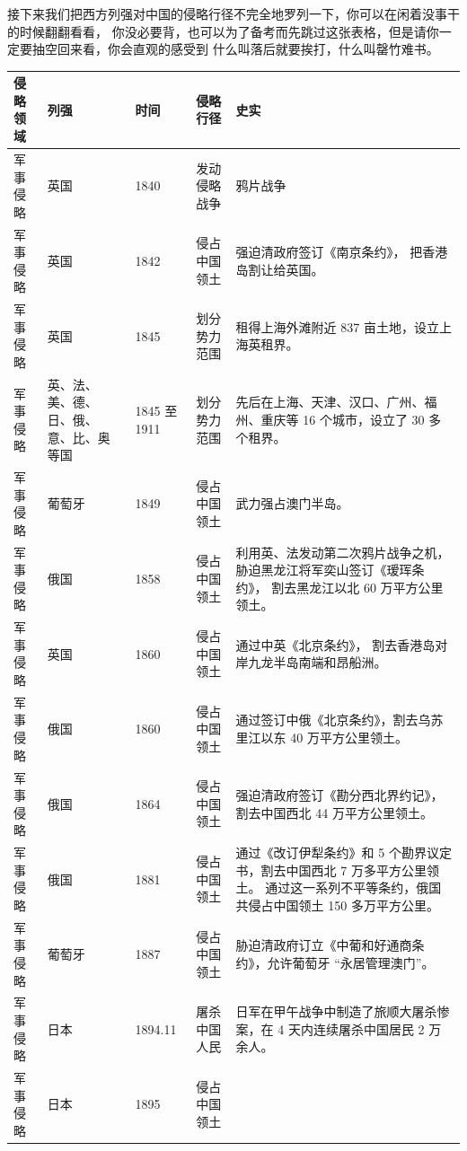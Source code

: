 \documentclass[10pt, UTF8]{book} %
\begin{document}
接下来我们把西方列强对中国的侵略行径不完全地罗列一下，你可以在闲着没事干的时候翻翻看看，
你没必要背，也可以为了备考而先跳过这张表格，但是请你一定要抽空回来看，你会直观的感受到
什么叫落后就要挨打，什么叫罄竹难书。
\begin{longtable*}{p{0.12\textwidth}|p{0.08\textwidth}|p{0.08\textwidth}|p{0.14\textwidth}|p{0.45\textwidth}}
    \toprule
    \textbf{侵略领域} & \textbf{列强} & \textbf{时间} 
    & \textbf{侵略行径} & \textbf{史实} \\
    \midrule
    \endhead
    军事侵略 & 英国 & 1840 & 发动侵略战争 & 鸦片战争 \\
    \hline
    军事侵略 & 英国 & 1842 & 侵占中国领土 & 强迫清政府签订《南京条约》，
    把香港岛割让给英国。 \\
    \hline
    军事侵略 & 英国 & 1845 & 划分势力范围 & 
    租得上海外滩附近 837 亩土地，设立上海英租界。 \\
    \hline
    军事侵略 & 英、法、美、德、日、俄、意、比、奥等国 & 1845 至 1911 & 划分势力范围 & 
    先后在上海、天津、汉口、广州、福州、重庆等 16 个城市，设立了 30 多个租界。 \\
    \hline
    军事侵略 & 葡萄牙 & 1849 & 侵占中国领土 & 武力强占澳门半岛。 \\
    \hline
    军事侵略 & 俄国 & 1858 & 侵占中国领土 & 
    利用英、法发动第二次鸦片战争之机，胁迫黑龙江将军奕山签订《瑷珲条约》，
    割去黑龙江以北 60 万平方公里领土。 \\
    \hline
    军事侵略 & 英国 & 1860 & 侵占中国领土 & 通过中英《北京条约》，
    割去香港岛对岸九龙半岛南端和昂船洲。 \\
    \hline
    军事侵略 & 俄国 & 1860 & 侵占中国领土 & 
    通过签订中俄《北京条约》，割去乌苏里江以东 40 万平方公里领土。 \\
    \hline
    军事侵略 & 俄国 & 1864 & 侵占中国领土 & 
    强迫清政府签订《勘分西北界约记》，割去中国西北 44 万平方公里领土。 \\
    \hline
    军事侵略 & 俄国 & 1881 & 侵占中国领土 & 
    通过《改订伊犁条约》和 5 个勘界议定书，割去中国西北 7 万多平方公里领土。
    通过这一系列不平等条约，俄国共侵占中国领土 150 多万平方公里。 \\
    \hline
    军事侵略 & 葡萄牙 & 1887 & 侵占中国领土 & 
    胁迫清政府订立《中葡和好通商条约》，允许葡萄牙 “永居管理澳门”。 \\
    \hline
    军事侵略 & 日本 & 1894.11 & 屠杀中国人民 
    & 日军在甲午战争中制造了旅顺大屠杀惨案，在 4 天内连续屠杀中国居民 2 万余人。 \\
    \hline
    军事侵略 & 日本 & 1895 & 侵占中国领土 

\end{longtable*}
\end{document}
